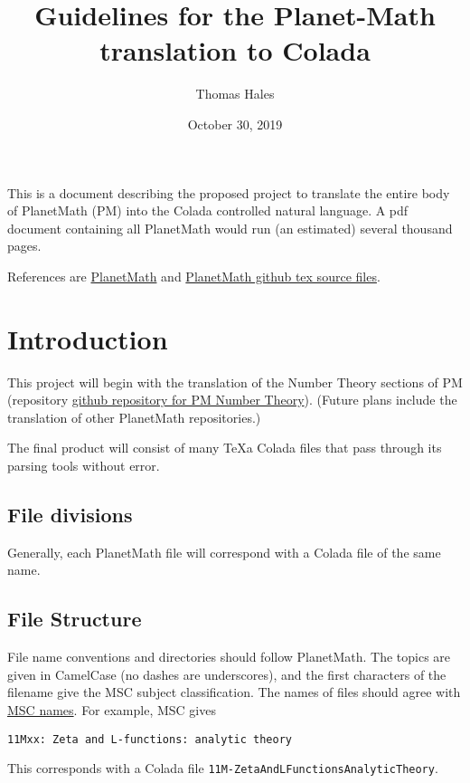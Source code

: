 \documentclass[12pt]{article}
\title{Guidelines for the Planet-Math translation to Colada}
\date{October 30, 2019}
\author{Thomas Hales}
\numberwithin{definition}{section}
\begin{document}
\maketitle

\setcounter{tocdepth}{2}
\tableofcontents
\newpage

\newcommand{\Nat}{{\mathbb N}}
\newcommand{\Int}{{\mathbb Z}}
\newcommand{\Real}{{\mathbb R}}

This is a document describing the proposed project to translate
the entire body of PlanetMath (PM) into the Colada controlled
natural language.
A pdf document containing all PlanetMath would run
(an estimated) 
several thousand pages.


References are \href{https://planetmath.org}{PlanetMath}
and \href{https://github.com/planetmath}{PlanetMath github tex source files}.



\section{Introduction}

This project will begin with the translation of the Number Theory sections 
of PM (repository \href{https://github.com/planetmath/11_Number_theory}{github repository for PM Number Theory}).
(Future plans include the translation of  other PlanetMath repositories.)

The final product will consist of 
  many TeXa Colada files that pass through its parsing tools
  without error.

\subsection{File divisions}

 
 Generally, each PlanetMath file will correspond with a Colada file of the same name.
 
  \subsection{File Structure}
  File name conventions and directories should follow PlanetMath.  The topics
are given in CamelCase (no dashes are underscores), and the first
characters of the filename give the MSC subject classification.
The names of files should agree with 
\href{https://cran.r-project.org/web/classifications/MSC-2010.html}{MSC names}.
For example, MSC gives
\begin{verbatim}
11Mxx: Zeta and L-functions: analytic theory 
\end{verbatim}
This corresponds with a Colada file {\tt 11M-ZetaAndLFunctionsAnalyticTheory}.
\end{document}

